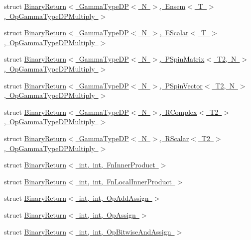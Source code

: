 \begin{DoxyCompactItemize}
struct \mbox{\hyperlink{structENSEM_1_1BinaryReturn_3_01GammaTypeDP_3_01N_01_4_00_01Ensem_3_01T_01_4_00_01OpGammaTypeDPMultiply_01_4}{Binary\+Return$<$ Gamma\+Type\+D\+P$<$ N $>$, Ensem$<$ T $>$, Op\+Gamma\+Type\+D\+P\+Multiply $>$}}
\item 
struct \mbox{\hyperlink{structENSEM_1_1BinaryReturn_3_01GammaTypeDP_3_01N_01_4_00_01EScalar_3_01T_01_4_00_01OpGammaTypeDPMultiply_01_4}{Binary\+Return$<$ Gamma\+Type\+D\+P$<$ N $>$, E\+Scalar$<$ T $>$, Op\+Gamma\+Type\+D\+P\+Multiply $>$}}
\item 
struct \mbox{\hyperlink{structENSEM_1_1BinaryReturn_3_01GammaTypeDP_3_01N_01_4_00_01PSpinMatrix_3_01T2_00_01N_01_4_00_01OpGammaTypeDPMultiply_01_4}{Binary\+Return$<$ Gamma\+Type\+D\+P$<$ N $>$, P\+Spin\+Matrix$<$ T2, N $>$, Op\+Gamma\+Type\+D\+P\+Multiply $>$}}
\item 
struct \mbox{\hyperlink{structENSEM_1_1BinaryReturn_3_01GammaTypeDP_3_01N_01_4_00_01PSpinVector_3_01T2_00_01N_01_4_00_01OpGammaTypeDPMultiply_01_4}{Binary\+Return$<$ Gamma\+Type\+D\+P$<$ N $>$, P\+Spin\+Vector$<$ T2, N $>$, Op\+Gamma\+Type\+D\+P\+Multiply $>$}}
\item 
struct \mbox{\hyperlink{structENSEM_1_1BinaryReturn_3_01GammaTypeDP_3_01N_01_4_00_01RComplex_3_01T2_01_4_00_01OpGammaTypeDPMultiply_01_4}{Binary\+Return$<$ Gamma\+Type\+D\+P$<$ N $>$, R\+Complex$<$ T2 $>$, Op\+Gamma\+Type\+D\+P\+Multiply $>$}}
\item 
struct \mbox{\hyperlink{structENSEM_1_1BinaryReturn_3_01GammaTypeDP_3_01N_01_4_00_01RScalar_3_01T2_01_4_00_01OpGammaTypeDPMultiply_01_4}{Binary\+Return$<$ Gamma\+Type\+D\+P$<$ N $>$, R\+Scalar$<$ T2 $>$, Op\+Gamma\+Type\+D\+P\+Multiply $>$}}
\item 
struct \mbox{\hyperlink{structENSEM_1_1BinaryReturn_3_01int_00_01int_00_01FnInnerProduct_01_4}{Binary\+Return$<$ int, int, Fn\+Inner\+Product $>$}}
\item 
struct \mbox{\hyperlink{structENSEM_1_1BinaryReturn_3_01int_00_01int_00_01FnLocalInnerProduct_01_4}{Binary\+Return$<$ int, int, Fn\+Local\+Inner\+Product $>$}}
\item 
struct \mbox{\hyperlink{structENSEM_1_1BinaryReturn_3_01int_00_01int_00_01OpAddAssign_01_4}{Binary\+Return$<$ int, int, Op\+Add\+Assign $>$}}
\item 
struct \mbox{\hyperlink{structENSEM_1_1BinaryReturn_3_01int_00_01int_00_01OpAssign_01_4}{Binary\+Return$<$ int, int, Op\+Assign $>$}}
\item 
struct \mbox{\hyperlink{structENSEM_1_1BinaryReturn_3_01int_00_01int_00_01OpBitwiseAndAssign_01_4}{Binary\+Return$<$ int, int, Op\+Bitwise\+And\+Assign $>$}}

\end{DoxyCompactItemize}
